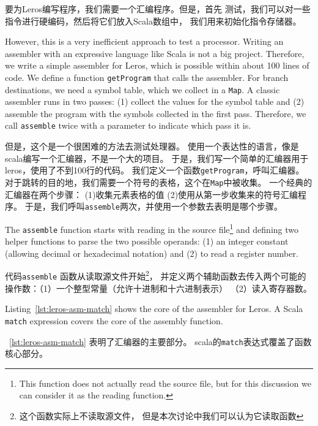\documentclass[%
    10pt,
    headinclude, footexclude,
    openright, %
    notitlepage,
    cleardoubleempty,
    headsepline,
    pointlessnumbers,
    bibtotoc, idxtotoc,
    ]{scrbook}
\newcommand{\code}[1]{{\small{\texttt{#1}}}}
\newcommand{\todo}[1]{{\emph{TODO: #1}}}
\renewcommand{\todo}[1]{}
\begin{document}
要为Leros编写程序，我们需要一个汇编程序。但是，首先
测试，我们可以对一些指令进行硬编码，然后将它们放入Scala数组中，
我们用来初始化指令存储器。


\noindent However, this is a very inefficient approach to test a processor.
Writing an assembler with an expressive language like Scala is not a big project.
Therefore, we write a simple assembler for Leros, which is possible within about
100 lines of code. We define a function \code{getProgram} that calls the assembler.
For branch destinations, we need a symbol table, which we collect in a \code{Map}.
A classic assembler runs in two passes: (1) collect the values for the symbol table
and (2) assemble the program with the symbols collected in the first pass.
Therefore, we call \code{assemble} twice with a parameter to indicate which pass it is.

\noindent 但是，这个是一个很困难的方法去测试处理器。
使用一个表达性的语言，像是scala编写一个汇编器，不是一个大的项目。
于是，我们写一个简单的汇编器用于leros，使用了不到100行的代码。
我们定义一个函数\code{getProgram}，呼叫汇编器。
对于跳转的目的地，我们需要一个符号的表格，这个在\code{Map}中被收集。
一个经典的汇编器在两个步骤：
(1)收集元素表格的值
(2)使用从第一步收集来的符号汇编程序。
于是，我们呼叫\code{assemble}两次，并使用一个参数去表明是哪个步骤。


The \code{assemble} function starts with reading in the source
file\footnote{This function does not actually read the source file, but for this
discussion we can consider it as the reading function.}
and defining two helper functions to parse the two possible operands: (1) an
integer constant (allowing decimal or hexadecimal notation) and (2) to read
a register number.

代码\code{assemble} 函数从读取源文件开始\footnote{这个函数实际上不读取源文件，
但是本次讨论中我们可以认为它读取函数}，
并定义两个辅助函数去传入两个可能的操作数：（1）一个整型常量（允许十进制和十六进制表示）
（2）读入寄存器数。


Listing~\ref{lst:leros-asm-match} shows the core of the assembler for Leros.
A Scala \code{match} expression covers the core of the assembly function.
\todo{Some more words on the code.}

~\ref{lst:leros-asm-match} 表明了汇编器的主要部分。
scala的\code{match}表达式覆盖了函数核心部分。
\end{document}
